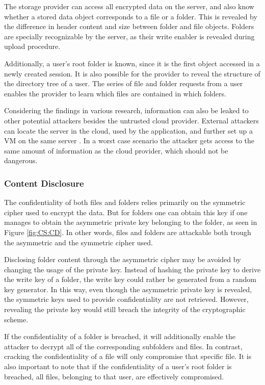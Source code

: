 \documentclass[pdftex,english,10pt,b5paper,twoside]{book}
\begin{document}
The storage provider can access all encrypted data on the server, and also know
whether a stored data object corresponds to a file or a folder. This is
revealed by the difference in header content and size between folder and file
objects. Folders are specially recognizable by the server, as their write
enabler is revealed during upload procedure.

Additionally, a user's root folder is known, since it is the first object
accessed in a newly created session. It is also possible for the provider to
reveal the structure of the directory tree of a user. The series of file and
folder requests from a user enables the provider to learn which files are
contained in which folders.

Considering the findings in various research, information can also be leaked to
other potential attackers besides the untrusted cloud provider. External
attackers can locate the server in the cloud, used by the application, and
further set up a \ac{VM} on the same server \cite{cloud_getoff}. In a worst
case scenario the attacker gets access to the same amount of information as the
cloud provider, which should not be dangerous.

\subsubsection{Content Disclosure}

The confidentiality of both files and folders relies primarily on the symmetric
cipher used to encrypt the data. But for folders one can obtain this key if one
manages to obtain the asymmetric private key belonging to the folder, as seen
in Figure \ref{fig:CS:CD}. In other words, files and folders are attackable
both trough the asymmetric and the symmetric cipher used.

Disclosing folder content through the asymmetric cipher may be avoided by
changing the usage of the private key. Instead of hashing the private key to
derive the write key of a folder, the write key could rather be generated from
a random key generator. In this way, even though the asymmetric private key is
revealed, the symmetric keys used to provide confidentiality are not retrieved.
However, revealing the private key would still breach the integrity of the
cryptographic scheme.

If the confidentiality of a folder is breached, it will additionally enable the
attacker to decrypt all of the corresponding subfolders and files. In
contrast, cracking the confidentiality of a file will only compromise that
specific file. It is also important to note that if the confidentiality of a
user's root folder is breached, all files, belonging to that user, are
effectively compromised.
\end{document}
